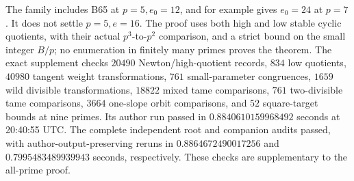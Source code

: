 \begin{remark}
\label{rem:B-RD66-scope}
The family includes B65 at $p=5,e_0=12$, and for example gives
$e_0=24$ at $p=7$. It does not settle $p=5,e=16$. The proof uses
both high and low stable cyclic quotients, with their actual
$p^3$-to-$p^2$ comparison, and a strict bound on the small integer
$B/p$; no enumeration in finitely many primes proves the theorem.
The exact supplement
checks $20490$ Newton/high-quotient records, $834$ low quotients,
$40980$ tangent weight transformations, $761$ small-parameter
congruences, $1659$ wild divisible transformations, $18822$ mixed
tame comparisons, $761$ two-divisible tame comparisons, $3664$
one-slope orbit comparisons, and $52$ square-target bounds at
nine primes. Its author run passed in $0.8840610159968492$ seconds
at 20:40:55 UTC. The complete independent root and companion audits passed, with author-output-preserving reruns in $0.8864672490017256$ and $0.7995483489939943$ seconds, respectively. These checks are supplementary to the all-prime proof.
\end{remark}

